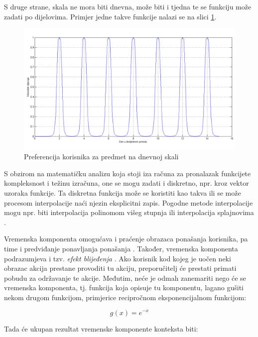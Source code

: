 \documentclass[times, utf8, diplomski, numeric]{fer}
\begin{document}
S druge strane, skala ne mora biti dnevna, može biti i tjedna te se funkciju
može zadati po dijelovima. Primjer jedne takve funkcije nalazi se na slici
\ref{fig:Gauss2}.

\begin{figure}[H]
	\centering
	\includegraphics[width=14.21cm]{images/neprigusenocropped.png}
	\caption{Preferencija korisnika za predmet na dnevnoj skali}
	\label{fig:Gauss2}
\end{figure}

S obzirom na matematičku analizu koja stoji iza računa za pronalazak funkcijete
kompleksnost i težinu izračuna, one se mogu zadati i diskretno, npr. kroz vektor
uzoraka funkcije. Ta diskretna funkcija može se koristiti kao takva ili se može
procesom interpolacije naći njezin eksplicitni zapis. Pogodne metode
interpolacije mogu npr. biti interpolacija polinomom višeg stupnja ili
interpolacija splajnovima .

Vremenska komponenta omogućava i praćenje obrazaca ponašanja korisnika, pa time
i predviđanje ponavljanja ponašanja . Također, vremenska
komponenta podrazumjeva i tzv. \emph{efekt blijeđenja} .
Ako korisnik kod kojeg je uočen neki obrazac akcija prestane provoditi tu
akciju, preporučitelj će prestati primati pobudu za održavanje te akcije.
Međutim, neće je odmah zanemariti nego će se vremenska komponenta, tj. funkcija
koja opisuje tu komponentu, lagano gušiti nekom drugom funkcijom, primjerice
recipročnom eksponencijalnom funkcijom:

\begin{equation}
	\label{eq:RecipExp}
	g(x) = e^{-x}
\end{equation}

Tada će ukupan rezultat vremenske komponente konteksta biti:
\end{document}

